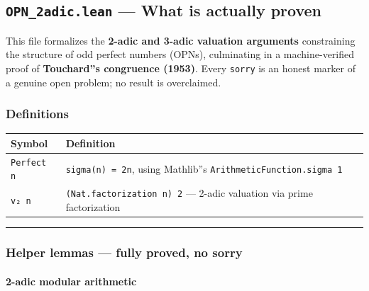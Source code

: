 \documentclass[11pt,a4paper]{article}
\begin{document}
\subsection{\texttt{OPN\_2adic.lean} --- What is actually proven}

This file formalizes the \textbf{2-adic and 3-adic valuation arguments} constraining the structure of
odd perfect numbers (OPNs), culminating in a machine-verified proof of \textbf{Touchard''s congruence
(1953)}. Every \texttt{sorry} is an honest marker of a genuine open problem; no result is overclaimed.

\subsubsection{Definitions}

\begin{table}[htbp]
\centering
\small
{}
\begin{tabularx}{\textwidth}{>{\centering\arraybackslash}X >{\centering\arraybackslash}X}
\toprule
\rowcolor{gray!25}\textbf{Symbol} & \textbf{Definition} \\
\midrule
\rowcolors{1}{white}{gray!10}
\texttt{Perfect n} & \texttt{sigma(n) = 2n}, using Mathlib''s \texttt{ArithmeticFunction.sigma 1} \\
\texttt{v₂ n} & \texttt{(Nat.factorization n) 2} --- 2-adic valuation via prime factorization \\
\bottomrule
\end{tabularx}
\end{table}

\begin{center}
\rule{0.5\textwidth}{0.4pt}
\end{center}

\subsubsection{Helper lemmas --- fully proved, no sorry}

\paragraph{2-adic modular arithmetic}
\end{document}
